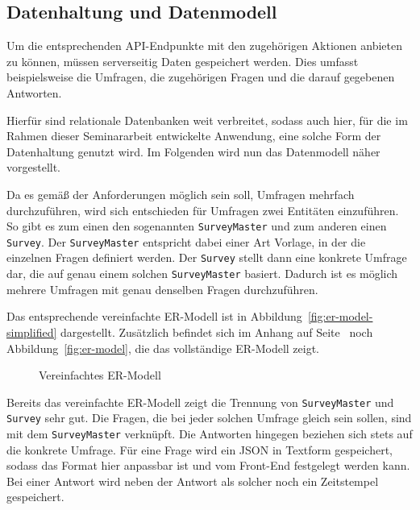 
\subsection{Datenhaltung und Datenmodell}
Um die entsprechenden \acs{API}-Endpunkte mit den zugehörigen Aktionen anbieten zu können, müssen serverseitig Daten gespeichert werden.
Dies umfasst beispielsweise die Umfragen, die zugehörigen Fragen und die darauf gegebenen Antworten.

Hierfür sind relationale Datenbanken weit verbreitet, sodass auch hier, für die im Rahmen dieser Seminararbeit entwickelte Anwendung, eine solche Form der Datenhaltung genutzt wird.
Im Folgenden wird nun das Datenmodell näher vorgestellt.

Da es gemäß der Anforderungen möglich sein soll, Umfragen mehrfach durchzuführen, wird sich entschieden für Umfragen zwei Entitäten einzuführen.
So gibt es zum einen den sogenannten \texttt{SurveyMaster} und zum anderen einen \texttt{Survey}.
Der \texttt{SurveyMaster} entspricht dabei einer Art Vorlage, in der die einzelnen Fragen definiert werden.
Der \texttt{Survey} stellt dann eine konkrete Umfrage dar, die auf genau einem solchen \texttt{SurveyMaster} basiert.
Dadurch ist es möglich mehrere Umfragen mit genau denselben Fragen durchzuführen.

Das entsprechende vereinfachte \acs{ER-Modell} ist in Abbildung~\vref{fig:er-model-simplified} dargestellt.
Zusätzlich befindet sich im Anhang auf Seite~\pageref{fig:er-model} noch Abbildung~\ref{fig:er-model}, die das vollständige \acs{ER-Modell} zeigt.

\begin{figure}[ht]
	\centering
	\def\svgscale{0.72}
	\graphicspath{{img/backend/database/}}
	\scriptsize{}
	\caption{Vereinfachtes \acs{ER-Modell}}
	\label{fig:er-model-simplified}
\end{figure}

Bereits das vereinfachte \acs{ER-Modell} zeigt die Trennung von \texttt{SurveyMaster} und \texttt{Survey} sehr gut.
Die Fragen, die bei jeder solchen Umfrage gleich sein sollen, sind mit dem \texttt{SurveyMaster} verknüpft.
Die Antworten hingegen beziehen sich stets auf die konkrete Umfrage.
Für eine Frage wird ein \acs{JSON} in Textform gespeichert, sodass das Format hier anpassbar ist und vom Front-End festgelegt werden kann.
Bei einer Antwort wird neben der Antwort als solcher noch ein Zeitstempel gespeichert.

